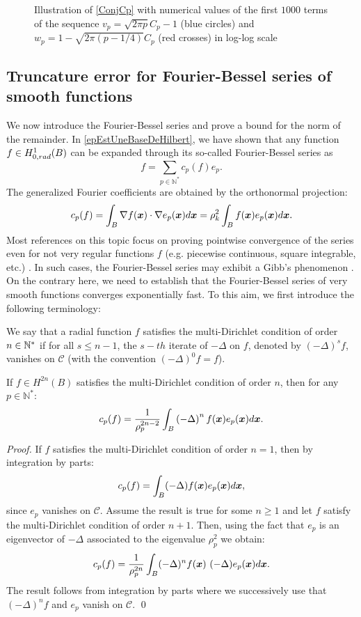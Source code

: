 \documentclass[smallextended]{svjour3}
\begin{document}
\begin{figure}[H]
	\centering
	
	\caption{Illustration of \autoref{ConjCp} with numerical values of the first $1000$ terms of the sequence ${v_p = \sqrt{2\pi p}C_p - 1}$ (blue circles) and ${w_p = 1 - \sqrt{2\pi(p-1/4)}C_p}$ (red crosses) in log-log scale}
	\label{figure:encadrementCp}
\end{figure}

\subsection{Truncature error for Fourier-Bessel series of smooth functions}
\label{FourierBesselTruncError}
We now introduce the Fourier-Bessel series and prove a bound for the norm of the remainder. 
In \autoref{epEstUneBaseDeHilbert}, we have shown that any function $f \in H^1_{0,rad}(B)$ can be expanded through its so-called Fourier-Bessel series as
\[f = \sum_{p\in \mathbb{N}^*}c_p(f)e_{p}.\]
The generalized Fourier coefficients are obtained by the orthonormal projection: 
\[c_p(f) = \displaystyle \int_B \nabla f(\boldsymbol{x}) \cdot \nabla e_{p}(\boldsymbol{x}) d\boldsymbol{x} = \rho_k^2 \int_{B}{f(\boldsymbol{x}) e_p(\boldsymbol{x})d\boldsymbol{x}}.\]
Most references on this topic focus on proving pointwise convergence of the series even for not very regular functions $f$ (e.g. piecewise continuous, square integrable, etc.) \cite{stempak2002convergence,guadalupe1993mean,Balodis1999,colzani1993equiconvergence}.  In such cases, the Fourier-Bessel series may exhibit a Gibb's phenomenon \cite{wilton1928gibbs}. On the contrary here, we need to establish that the Fourier-Bessel series of very smooth functions converges exponentially fast. To this aim, we first introduce the following terminology: 
\begin{definition}
	We say that a radial function $f$ satisfies the multi-Dirichlet condition of order $n \in \mathbb{N}^*$ if for all $s \leq n-1$, the $s-th$ iterate of $-\Delta$ on $f$, denoted by $(-\Delta)^s f$, vanishes on $\mathcal{C}$ (with the convention $(-\Delta)^0 f = f$). 
\end{definition}
\begin{proposition} 
	\label{DecroissanceFourierBessel}
	If $f \in H^{2n}(B)$ satisfies the multi-Dirichlet condition of order $n$, then for any $p \in \mathbb{N}^*$:
	\[ c_p(f) = \dfrac{1}{\rho_{p}^{2n-2}} \int_{B}\left(-\Delta\right)^{n} f(\boldsymbol{x})e_p(\boldsymbol{x}) d\boldsymbol{x}.\] 
\end{proposition}
\begin{proof}
	If $f$ satisfies the multi-Dirichlet condition of order $n=1$, then by integration by parts:
	\[c_p(f) = \int_{B}(-\Delta)f(\boldsymbol{x}) e_p(\boldsymbol{x})d\boldsymbol{x},\]
	since $e_p$ vanishes on $\mathcal{C}$.
	Assume the result is true for some $n \geq 1$ and let $f$ satisfy the multi-Dirichlet condition of order $n+1$. Then, using the fact that $e_p$ is an eigenvector of $-\Delta$ associated to the eigenvalue $\rho_p^2$ we obtain:
	\[c_p(f) = \frac{1}{\rho_p^{2n}}\int_{B}(-\Delta)^{n}f(\boldsymbol{x})~ (-\Delta) e_p(\boldsymbol{x}) d\boldsymbol{x}.\]
	The result follows from integration by parts where we successively use that $(-\Delta)^{n}f$ and $e_p$ vanish on $\mathcal{C}$.
	\qed
\end{proof}
\end{document}

